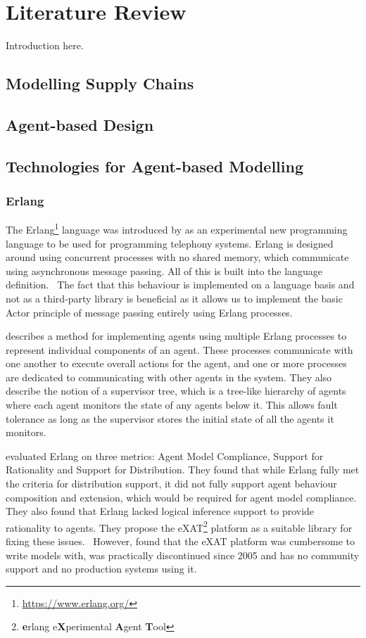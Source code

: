 \section{Literature Review}

Introduction here.

\subsection{Modelling Supply Chains}

\subsection{Agent-based Design}

\subsection{Technologies for Agent-based Modelling}

\subsubsection{Erlang}

The Erlang\footnote{\url{https://www.erlang.org/}} language was introduced by  as an experimental new programming language to be used for programming telephony systems.
Erlang is designed around using concurrent processes with no shared memory, which communicate using asynchronous message passing.
All of this is built into the language definition.~\cite{armstrong2007history}
The fact that this behaviour is implemented on a language basis and not as a third-party library is beneficial as it allows us to implement the basic Actor principle of message passing entirely using Erlang processes.

 describes a method for implementing agents using multiple Erlang processes to represent individual components of an agent.
These processes communicate with one another to execute overall actions for the agent, and one or more processes are dedicated to communicating with other agents in the system.
They also describe the notion of a supervisor tree, which is a tree-like hierarchy of agents where each agent monitors the state of any agents below it.
This allows fault tolerance as long as the supervisor stores the initial state of all the agents it monitors.

 evaluated Erlang on three metrics: Agent Model Compliance, Support for Rationality and Support for Distribution.
They found that while Erlang fully met the criteria for distribution support, it did not fully support agent behaviour composition and extension, which would be required for agent model compliance.
They also found that Erlang lacked logical inference support to provide rationality to agents.
They propose the eXAT\footnote{\textbf{e}rlang e\textbf{X}perimental \textbf{A}gent \textbf{T}ool} platform as a suitable library for fixing these issues.~\cite{di2003exat}
However,  found that the eXAT platform was cumbersome to write models with, was practically discontinued since 2005 and has no community support and no production systems using it.

